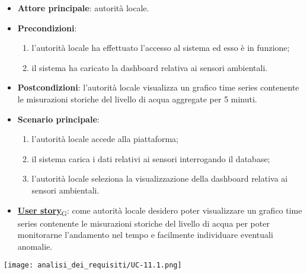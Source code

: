 \begin{itemize}
	\item \textbf{Attore principale}: autorità locale.
	\item \textbf{Precondizioni}:
	      \begin{enumerate}
		      \item l'autorità locale ha effettuato l'accesso al sistema ed esso è in funzione;
		      \item il sistema ha caricato la dashboard relativa ai sensori ambientali.
	      \end{enumerate}
	\item \textbf{Postcondizioni}: l'autorità locale visualizza un grafico time series contenente le misurazioni storiche
	      del livello di acqua aggregate per 5 minuti.
	\item \textbf{Scenario principale}:
	      \begin{enumerate}
		      \item l'autorità locale accede alla piattaforma;
		      \item il sistema carica i dati relativi ai sensori interrogando il database;
		      \item l'autorità locale seleziona la visualizzazione della dashboard relativa ai sensori ambientali.
	      \end{enumerate}
	\item \href{https://7last.github.io/docs/rtb/documentazione-interna/glossario\#user-story}{\textbf{User story}\textsubscript{G}}:
	      come autorità locale desidero poter visualizzare un grafico time series contenente le misurazioni storiche
	      del livello di acqua per poter monitorarne l'andamento nel tempo e facilmente individuare eventuali anomalie.
\end{itemize}
\begin{center}
	\texttt{[image: analisi\_dei\_requisiti/UC-11.1.png]}
\end{center}



